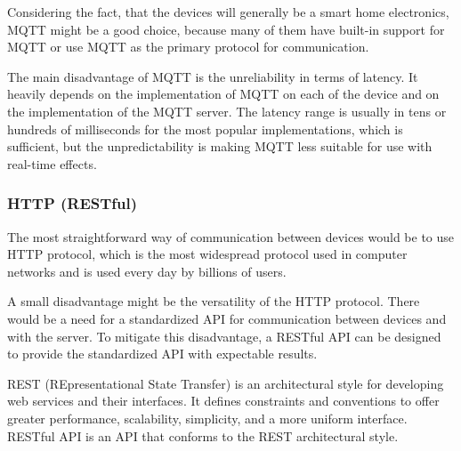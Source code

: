 Considering the fact, that the devices will generally be a smart home
electronics, MQTT might be a good choice, because many of them have built-in
support for MQTT or use MQTT as the primary protocol for communication.


The main disadvantage of MQTT is the unreliability in terms of latency.
It heavily depends on the implementation of MQTT on each of the device and on
the implementation of the MQTT server. The latency range is usually
in tens or hundreds of milliseconds for the most popular implementations,
\hyperlink{mqttlat}{} which is sufficient, but the unpredictability is making MQTT
less suitable for use with real-time effects.


\hypertarget{x-http-(restful)}{\subsubsection*{HTTP (RESTful)}}
The most straightforward way of communication between devices would be to use
HTTP protocol, which is the most widespread protocol used in computer networks
and is used every day by billions of users. \hyperlink{httpsrv}{}


A small disadvantage might be the versatility of the HTTP protocol. There would be
a need for a standardized API for communication between devices and with the
server. To mitigate this disadvantage, a RESTful API can be designed to provide
the standardized API with expectable results.


REST (REpresentational State Transfer) is an architectural style for developing
web services and their interfaces. It defines constraints and conventions to
offer greater performance, scalability, simplicity, and a more uniform interface.
\hyperlink{restdef}{} RESTful API is an API that conforms to the REST architectural style.